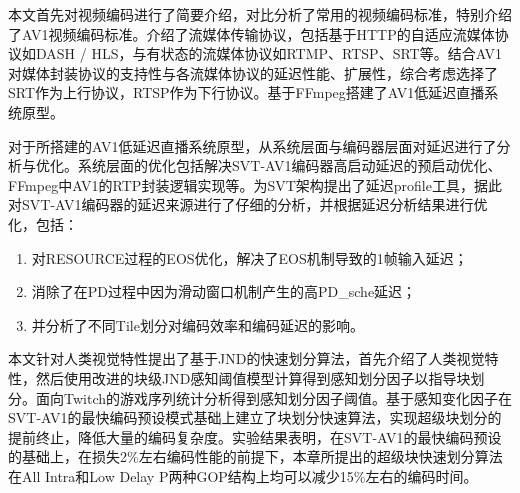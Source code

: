 
\begin{summary}

  本文首先对视频编码进行了简要介绍，对比分析了常用的视频编码标准，特别介绍了AV1视频编码标准。介绍了流媒体传输协议，包括基于HTTP的自适应流媒体协议如DASH / HLS，与有状态的流媒体协议如RTMP、RTSP、SRT等。结合AV1对媒体封装协议的支持性与各流媒体协议的延迟性能、扩展性，综合考虑选择了SRT作为上行协议，RTSP作为下行协议。基于FFmpeg搭建了AV1低延迟直播系统原型。

  对于所搭建的AV1低延迟直播系统原型，从系统层面与编码器层面对延迟进行了分析与优化。系统层面的优化包括解决SVT-AV1编码器高启动延迟的预启动优化、FFmpeg中AV1的RTP封装逻辑实现等。为SVT架构提出了延迟profile工具，据此对SVT-AV1编码器的延迟来源进行了仔细的分析，并根据延迟分析结果进行优化，包括：
  \begin{enumerate}
  	\item 对RESOURCE过程的EOS优化，解决了EOS机制导致的1帧输入延迟；
  	\item 消除了在PD过程中因为滑动窗口机制产生的高PD\_sche延迟；
  	\item 并分析了不同Tile划分对编码效率和编码延迟的影响。
  \end{enumerate}

  本文针对人类视觉特性提出了基于JND的快速划分算法，首先介绍了人类视觉特性，然后使用改进的块级JND感知阈值模型计算得到感知划分因子以指导块划分。面向Twitch的游戏序列统计分析得到感知划分因子阈值。基于感知变化因子在SVT-AV1的最快编码预设模式基础上建立了块划分快速算法，实现超级块划分的提前终止，降低大量的编码复杂度。实验结果表明，在SVT-AV1的最快编码预设的基础上，在损失2\%左右编码性能的前提下，本章所提出的超级块快速划分算法在All Intra和Low Delay P两种GOP结构上均可以减少15\%左右的编码时间。


\end{summary}

